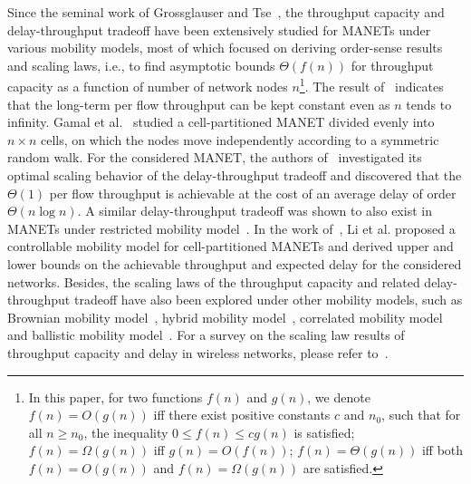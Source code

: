 \documentclass[twocolumn, 10pt]{svjour3}         \smartqed  \usepackage{graphicx}
\begin{document}
Since the seminal work of Grossglauser and Tse~\cite{Grossglauser2002}, the throughput capacity and  delay-throughput tradeoff have been extensively studied for MANETs under various mobility models, most of which focused on deriving  order-sense results and scaling laws, i.e., to find asymptotic bounds $\Theta(f(n))$ for throughput capacity as a function of number of network nodes $n$\footnote{In this paper, for two functions $f(n)$ and $g(n)$, we denote $f(n)=O(g(n))$ iff there exist positive constants $c$ and $n_0$, such that for all $n \geq n_0$, the inequality $0 \leq f(n) \leq c g(n)$ is satisfied; $f(n) = \Omega(g(n))$  iff $g(n) = O(f(n))$; $f(n)=\Theta(g(n))$ iff both $f(n)=O(g(n))$ and $f(n)=\Omega(g(n))$ are satisfied.}.
The result of~\cite{Grossglauser2002} indicates that the long-term per flow throughput can be kept constant even as $n$ tends to infinity.
Gamal et al.~\cite{Gamal2006a, Gamal2006} studied a cell-partitioned MANET divided evenly into $n \times n$ cells, on which the nodes move independently according to a symmetric random walk.
For the considered MANET, the authors of~\cite{Gamal2006a, Gamal2006} investigated its optimal scaling behavior of the delay-throughput tradeoff and discovered that the $\Theta (1)$ per flow throughput is achievable  at the cost of an average delay of order $\Theta(n \log{n})$.
A similar delay-throughput tradeoff was shown to also exist in MANETs under restricted mobility model~\cite{Mammen2007}.
In the work of~\cite{Li2012a}, Li et al. proposed a controllable mobility model for cell-partitioned MANETs and 
derived upper and lower bounds on  the achievable throughput and expected  delay for the considered networks.
Besides, the scaling laws of the throughput capacity and related delay-throughput tradeoff have also been explored under other mobility models, such as  Brownian mobility model~\cite{Gamal2004Proc.IEEEINFOCOM,Lin2006},   hybrid mobility model~\cite{Sharma2007}, correlated mobility model~\cite{ciullo2011impact} and ballistic mobility model~\cite{Bogo2013Proc.ACMMOBICOM}. 
For a survey on the scaling law results of throughput capacity and delay in wireless networks, please refer to~\cite{Lu2013}.
\end{document}
